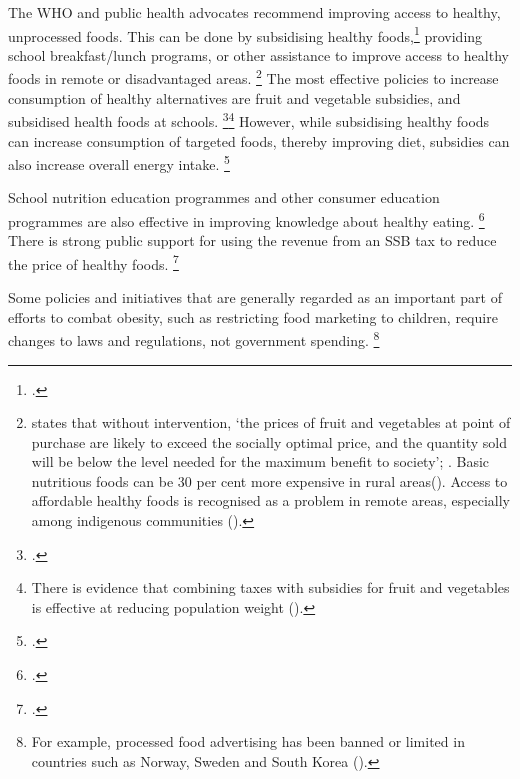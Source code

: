 \documentclass[embargoed]{grattan}
\begin{document}
The WHO and public health advocates recommend improving access to healthy, unprocessed foods.
This can be done by subsidising healthy foods,\footcites{LordanShouldweput}{Organization2016FiscalPoliciesDiet} providing school breakfast/lunch programs, or other assistance to improve access to healthy foods in remote or disadvantaged areas.%
\footnote{\textcite{Organisation2015Usingpricepolicies} states that without intervention, `the prices of fruit and vegetables at point of purchase are likely to exceed the socially optimal price, and the quantity sold will be below the level needed for the maximum benefit to society'; \textcite{Kaplin2013Usingeconomicpolicy}.
Basic nutritious foods can be 30 per cent more expensive in rural areas(\textcite{Health2012Australiasfood}).
Access to affordable healthy foods is recognised as a problem in remote areas, especially among indigenous communities (\textcite{Thurber2014OverweightobesityIndigenous}).} The most effective policies to increase consumption of healthy alternatives are fruit and vegetable subsidies, and subsidised health foods at schools.%
\footcites{Kaplin2013Usingeconomicpolicy}{Organization2016FiscalPoliciesDiet}{Thow2014systematicrevieweffectiveness}{An2013Eatingbetterless}\footnote{There is evidence that combining taxes with subsidies for fruit and vegetables is effective at reducing population weight (\textcite{Organization2016FiscalPoliciesDiet}).} However, while subsidising healthy foods can increase consumption of targeted foods, thereby improving diet, subsidies can also increase overall energy intake.%
\footcites{Kaplin2013Usingeconomicpolicy}{Organization2016FiscalPoliciesDiet}{Cawley2015economyscalesselective}

School nutrition education programmes and other consumer education programmes are also effective in improving knowledge about healthy eating.%
\footcites{Research2007EvaluationNationalGo}{Capacci2012Policiespromotehealthy}{Ebbeling2002Childhoodobesitypublic}{Hawkes2013Promotinghealthydiets}{Hawkes2015Smartfoodpolicies}{Organization2016Reportcommissionending} There is strong public support for using the revenue from an SSB tax to reduce the price of healthy foods.%
\footcite{Morley2012Publicopinionfood}

Some policies and initiatives that are generally regarded as an important part of efforts to combat obesity, such as restricting food marketing to children, require changes to laws and regulations, not government spending.%
\footnote{For example, processed food advertising has been banned or limited in countries such as Norway, Sweden and South Korea (\textcite{Cawley2015economyscalesselective}).}
\end{document}
